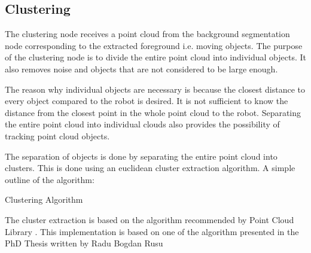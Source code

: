 
\subsection{Clustering}
The clustering node receives a point cloud from the background segmentation node corresponding to the extracted foreground i.e. moving objects. The purpose of the clustering node is to divide the entire point cloud into individual objects. It also removes noise and objects that are not considered to be large enough.  

The reason why individual objects are necessary is because the closest distance to every object compared to the robot is desired. It is not sufficient to know the distance from the closest point in the whole point cloud to the robot. Separating the entire point cloud into individual clouds also provides the possibility of tracking point cloud objects. 


The separation of objects is done by separating the entire point cloud into clusters. This is done using an euclidean cluster extraction algorithm. A simple outline of the algorithm:


\begin{algorithm}[H]
 \SetAlgoLined %
 \caption{Clustering Algorithm}
\end{algorithm}
 
The cluster extraction is based on the algorithm recommended by Point Cloud Library \cite{CE}. This implementation is based on one of the algorithm presented in the PhD Thesis written by Radu Bogdan Rusu \cite{clusterPhD}
